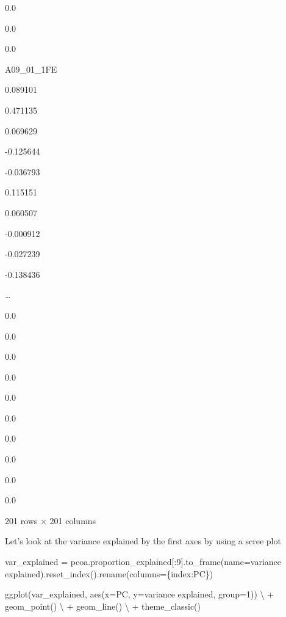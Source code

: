 \documentclass[
  letterpaper,
]{book}
\newenvironment{Shaded}{}{}
\newcommand{\DecValTok}[1]{\textcolor[rgb]{0.00,0.36,0.77}{#1}}
\newcommand{\NormalTok}[1]{\textcolor[rgb]{0.14,0.16,0.18}{#1}}
\newcommand{\OperatorTok}[1]{\textcolor[rgb]{0.14,0.16,0.18}{#1}}
\newcommand{\StringTok}[1]{\textcolor[rgb]{0.01,0.18,0.38}{#1}}
\begin{document}
0.0

0.0

0.0

A09\_01\_1FE

0.089101

0.471135

0.069629

-0.125644

-0.036793

0.115151

0.060507

-0.000912

-0.027239

-0.138436

\ldots{}

0.0

0.0

0.0

0.0

0.0

0.0

0.0

0.0

0.0

0.0

201 rows × 201 columns

Let's look at the variance explained by the first axes by using a scree
plot

\begin{Shaded}
\begin{Highlighting}[]
\NormalTok{var\_explained }\OperatorTok{=}\NormalTok{ pcoa.proportion\_explained[:}\DecValTok{9}\NormalTok{].to\_frame(name}\OperatorTok{=}\StringTok{\textquotesingle{}variance explained\textquotesingle{}}\NormalTok{).reset\_index().rename(columns}\OperatorTok{=}\NormalTok{\{}\StringTok{\textquotesingle{}index\textquotesingle{}}\NormalTok{:}\StringTok{\textquotesingle{}PC\textquotesingle{}}\NormalTok{\})}
\end{Highlighting}
\end{Shaded}

\begin{Shaded}
\begin{Highlighting}[]
\NormalTok{ggplot(var\_explained, aes(x}\OperatorTok{=}\StringTok{\textquotesingle{}PC\textquotesingle{}}\NormalTok{, y}\OperatorTok{=}\StringTok{\textquotesingle{}variance explained\textquotesingle{}}\NormalTok{, group}\OperatorTok{=}\DecValTok{1}\NormalTok{)) }\OperatorTok{\textbackslash{}}
\OperatorTok{+}\NormalTok{ geom\_point() }\OperatorTok{\textbackslash{}}
\OperatorTok{+}\NormalTok{ geom\_line() }\OperatorTok{\textbackslash{}}
\OperatorTok{+}\NormalTok{ theme\_classic()}
\end{Highlighting}
\end{Shaded}
\end{document}
